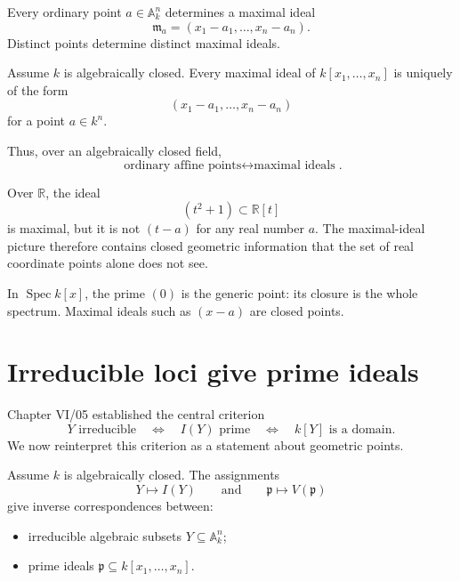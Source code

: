 \begin{proposition}
\label{prop:vi06-point-ideals}
Every ordinary point \(a\in\mathbb A_k^n\) determines a maximal ideal
\[
\mathfrak m_a=(x_1-a_1,\dots,x_n-a_n).
\]
Distinct points determine distinct maximal ideals.
\end{proposition}

\begin{theorem}
\label{thm:vi06-weak-nullstellensatz}
Assume \(k\) is algebraically closed.  Every maximal ideal of
\(k[x_1,\dots,x_n]\) is uniquely of the form
\[
(x_1-a_1,\dots,x_n-a_n)
\]
for a point \(a\in k^n\).
\end{theorem}

Thus, over an algebraically closed field,
\[
\boxed{
\text{ordinary affine points}
\longleftrightarrow
\text{maximal ideals}
}.
\]

\begin{remark}
Over \(\mathbb R\), the ideal
\[
(t^2+1)\subset\mathbb R[t]
\]
is maximal, but it is not \((t-a)\) for any real number \(a\).  The maximal-ideal
picture therefore contains closed geometric information that the set of real coordinate
points alone does not see.
\end{remark}

\begin{example}\label{ex:vi06-expand-01}
In $\operatorname{Spec}k[x]$, the prime $(0)$ is the generic point: its closure is the whole spectrum.  Maximal ideals such as $(x-a)$ are closed points.
\end{example}
\section{Irreducible loci give prime ideals}

Chapter VI/05 established the central criterion
\[
Y\text{ irreducible}
\quad\Longleftrightarrow\quad
I(Y)\text{ prime}
\quad\Longleftrightarrow\quad
k[Y]\text{ is a domain}.
\]
We now reinterpret this criterion as a statement about geometric points.

\begin{theorem}
\label{thm:vi06-prime-irreducible}
Assume \(k\) is algebraically closed.  The assignments
\[
Y\longmapsto I(Y)
\qquad\text{and}\qquad
\mathfrak p\longmapsto V(\mathfrak p)
\]
give inverse correspondences between:
\begin{itemize}
  \item irreducible algebraic subsets \(Y\subseteq\mathbb A_k^n\);
  \item prime ideals \(\mathfrak p\subseteq k[x_1,\dots,x_n]\).
\end{itemize}
\end{theorem}

